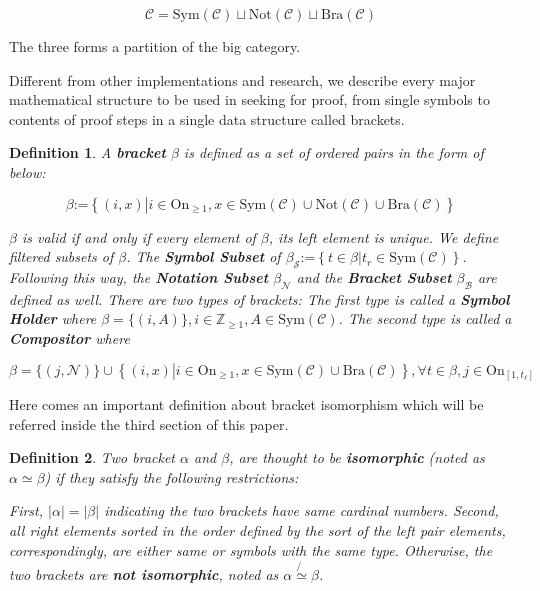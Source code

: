 \documentclass{article}
\newtheorem{definition}{Definition}	%
\numberwithin{theorem}{section}	%
\numberwithin{axiom}{section}	%
\numberwithin{definition}{section}	%
\begin{document}
\[\mathcal{C}=\text{Sym}(\mathcal{C})\sqcup \text{Not}(\mathcal{C})\sqcup \text{Bra}(\mathcal{C})\]

The three forms a partition of the big category.

Different from other implementations and research, we describe every major mathematical structure to be used in seeking for proof, from single symbols to contents of proof steps in a single data structure called brackets.

\begin{definition}
	A \textbf{ bracket} \(\beta\) is defined as a set of ordered pairs in the form of below:
	
	\[\beta \text{:=}\left\{(i,x)\left|i\in \text{On}_{\geq 1}\right.,x\in \text{Sym}(\mathcal{C})\cup \text{Not}(\mathcal{C})\cup \text{Bra}(\mathcal{C})\right\}\]
	
	\(\beta\) is valid if and only if every element of \(\beta\), its left element is unique. We define filtered subsets of \(\beta\). The \textbf{ Symbol Subset} of \(\beta _{\mathcal{S}}\text{:=}\left\{t\in \beta \left|t_{\mathit{r}}\in \text{Sym}(\mathcal{C})\right.\right\}\). Following this way, the \textbf{ Notation Subset} \(\beta _{\mathcal{N}}\) and the \textbf{ Bracket Subset} \(\beta _{\mathcal{B}}\) are defined as well. There are two types of brackets: The first type is called a \textbf{ Symbol Holder} where \(\beta =\{(i,A)\},i\in \mathbb{Z}_{\geq 1},A\in \text{Sym}(\mathcal{C})\). The second type is called a \textbf{ Compositor} where
	
	\[\beta =\{(j,\mathcal{N})\}\cup \left\{(i,x)\left|i\in \text{On}_{\geq 1}\right., x\in \text{Sym}(\mathcal{C})\cup \text{Bra}(\mathcal{C})\right\},\forall
	t\in \beta ,j\in \text{On}_{\left[1,t_{\ell }\right]}\]
\end{definition}

Here comes an important definition about bracket isomorphism which will be referred inside the third section of this paper.

\begin{definition}
	Two bracket \(\alpha\) and \(\beta\), are thought to be \textbf{ isomorphic} (noted as \(\alpha \simeq \beta\)) if they satisfy the following restrictions:
	
	First, \(|\alpha |=|\beta |\) indicating the two brackets have same cardinal numbers. Second, all right elements sorted in the order defined by the sort of the left pair elements, correspondingly, are either same or symbols with the same type. Otherwise, the two brackets are \textbf{ not isomorphic}, noted as \(\alpha \not{\simeq}\beta\).
\end{definition}
\end{document}
